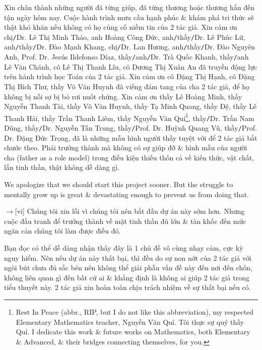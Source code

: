 \documentclass[12pt,oneside]{book}
\begin{document}
Xin chân thành những người đã từng giúp, đã từng thương hoặc thương hắn đến tận ngày hôm nay. Cuộc hành trình mưu cầu hạnh phúc \& khám phá tri thức sẽ thật khó khăn nếu không có họ củng cố niềm tin của 2 tác giả. Xin cảm ơn chị{\tt/}Dr. {\sc Lê Thị Minh Thảo}, anh {\sc Hoàng Công Đức}, anh{\tt/}thầy{\tt/}Dr. {\sc Lê Phúc Lữ}, anh{\tt/}thầy{\tt/}Dr.  {\sc Đào Mạnh Khang}, chị{\tt/}Dr.  {\sc Lan Hương}, anh{\tt/}thầy{\tt/}Dr.  {\sc Đào Nguyên Anh}, Prof. Dr. {\sc Jesús Ildefonso Díaz}, thầy{\tt/}anh{\tt/}Dr.  {\sc Trà Quốc Khanh}, thầy{\tt/}anh {\sc Lê Văn Chánh}, cô {\sc Lê Thị Thanh Lĩu}, cô {\sc Dương Thị Xuân An} đã truyền động lực trên hành trình học Toán của 2 tác giả. Xin cảm ơn cô {\sc Đặng Thị Hạnh}, cô {\sc Đặng Thị Bích Thư}, thầy {\sc Võ Văn Huynh} đã viếng đám tang của cha 2 tác giả, để họ không bị nỗi sợ bị bỏ rơi nuốt chửng. Xin cảm ơn thầy {\sc Lê Hoàng Minh}, thầy {\sc Nguyễn Thanh Tài}, thầy {\sc Võ Văn Huynh}, thầy {\sc Tạ Minh Quang}, thầy {\sc Đệ}, thầy {\sc Lê Thanh Hải}, thầy {\sc Trần Thanh Liêm}, thầy {\sc Nguyễn Văn Quí}\footnote{Rest In Peace (abbr., RIP, but I do not like this abbreviation), my respected Elementary Mathematics teacher, {\sc Nguyễn Văn Quí}. Tôi thực sự quý thầy {\sc Quí}. I dedicate this work \& future works on Mathematics, both Elementary \& Advanced, \& their bridges connecting themselves, for you.}, thầy{\tt/}Dr.  {\sc Trần Nam Dũng}, thầy{\tt/}Dr. {\sc Nguyễn Tấn Trung}, thầy{\tt/}Prof. Dr. {\sc Huỳnh Quang Vũ}, thầy{\tt/}Prof. Dr. {\sc Đặng Đức Trọng}, đã là những mẫu hình người thầy tuyệt vời để 2 tác giả bắt chước theo. Phải trưởng thành mà không có sự giúp đỡ \& hình mẫu của người cha (father as a role model) trong điều kiện thiếu thốn cả về kiến thức, vật chất, lẫn tinh thần, thật không dễ dàng gì.

We apologize that we should start this project sooner. But the struggle to mentally grow up is great \& devastating enough to prevent us from doing that.

{\sf[en]$\to$[vi]} Chúng tôi xin lỗi vì chúng tôi nên bắt đầu dự án này sớm hơn. Nhưng cuộc đấu tranh để trưởng thành về mặt tinh thần đủ lớn \& tàn khốc đến mức ngăn cản chúng tôi làm được điều đó.

Bạn đọc có thể dễ dàng nhận thấy đây là 1 chủ đề vô cùng nhạy cảm, cực kỳ nguy hiểm. Nên nếu dự án này thất bại, thì đều do sự non nớt của 2 tác giả với ngòi bút chưa đủ sắc bén nên không thể giải phẫu vấn đề này đến nơi đến chốn, không liên quan gì đến bất cứ ai \& khẳng định là không ai giúp 2 tác giả trong tiểu thuyết này. 2 tác giả xin hoàn toàn chịu trách nhiệm về sự thất bại nếu có.
\end{document}
